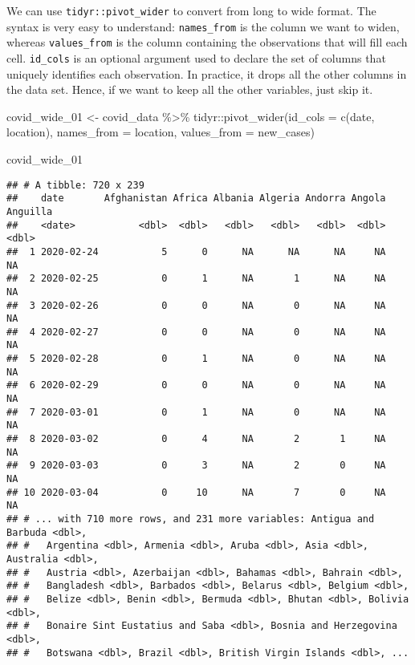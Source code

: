 \documentclass[
]{book}
\newenvironment{Shaded}{\begin{snugshade}}{\end{snugshade}}
\newcommand{\AttributeTok}[1]{\textcolor[rgb]{0.77,0.63,0.00}{#1}}
\newcommand{\FunctionTok}[1]{\textcolor[rgb]{0.00,0.00,0.00}{#1}}
\newcommand{\NormalTok}[1]{#1}
\newcommand{\OtherTok}[1]{\textcolor[rgb]{0.56,0.35,0.01}{#1}}
\newcommand{\SpecialCharTok}[1]{\textcolor[rgb]{0.00,0.00,0.00}{#1}}
\newcommand{\StringTok}[1]{\textcolor[rgb]{0.31,0.60,0.02}{#1}}
\begin{document}
We can use \texttt{tidyr::pivot\_wider} to convert from long to wide format. The syntax is very easy to understand: \texttt{names\_from} is the column we want to widen, whereas \texttt{values\_from} is the column containing the observations that will fill each cell. \texttt{id\_cols} is an optional argument used to declare the set of columns that uniquely identifies each observation. In practice, it drops all the other columns in the data set. Hence, if we want to keep all the other variables, just skip it.

\begin{Shaded}
\begin{Highlighting}[]
\NormalTok{covid\_wide\_01 }\OtherTok{\textless{}{-}}\NormalTok{ covid\_data }\SpecialCharTok{\%\textgreater{}\%} 
\NormalTok{  tidyr}\SpecialCharTok{::}\FunctionTok{pivot\_wider}\NormalTok{(}\AttributeTok{id\_cols     =} \FunctionTok{c}\NormalTok{(}\StringTok{\textquotesingle{}date\textquotesingle{}}\NormalTok{, }\StringTok{\textquotesingle{}location\textquotesingle{}}\NormalTok{), }
                     \AttributeTok{names\_from  =} \StringTok{\textquotesingle{}location\textquotesingle{}}\NormalTok{, }
                     \AttributeTok{values\_from =} \StringTok{\textquotesingle{}new\_cases\textquotesingle{}}\NormalTok{)}

\NormalTok{covid\_wide\_01}
\end{Highlighting}
\end{Shaded}

\begin{verbatim}
## # A tibble: 720 x 239
##    date       Afghanistan Africa Albania Algeria Andorra Angola Anguilla
##    <date>           <dbl>  <dbl>   <dbl>   <dbl>   <dbl>  <dbl>    <dbl>
##  1 2020-02-24           5      0      NA      NA      NA     NA       NA
##  2 2020-02-25           0      1      NA       1      NA     NA       NA
##  3 2020-02-26           0      0      NA       0      NA     NA       NA
##  4 2020-02-27           0      0      NA       0      NA     NA       NA
##  5 2020-02-28           0      1      NA       0      NA     NA       NA
##  6 2020-02-29           0      0      NA       0      NA     NA       NA
##  7 2020-03-01           0      1      NA       0      NA     NA       NA
##  8 2020-03-02           0      4      NA       2       1     NA       NA
##  9 2020-03-03           0      3      NA       2       0     NA       NA
## 10 2020-03-04           0     10      NA       7       0     NA       NA
## # ... with 710 more rows, and 231 more variables: Antigua and Barbuda <dbl>,
## #   Argentina <dbl>, Armenia <dbl>, Aruba <dbl>, Asia <dbl>, Australia <dbl>,
## #   Austria <dbl>, Azerbaijan <dbl>, Bahamas <dbl>, Bahrain <dbl>,
## #   Bangladesh <dbl>, Barbados <dbl>, Belarus <dbl>, Belgium <dbl>,
## #   Belize <dbl>, Benin <dbl>, Bermuda <dbl>, Bhutan <dbl>, Bolivia <dbl>,
## #   Bonaire Sint Eustatius and Saba <dbl>, Bosnia and Herzegovina <dbl>,
## #   Botswana <dbl>, Brazil <dbl>, British Virgin Islands <dbl>, ...
\end{verbatim}
\end{document}
